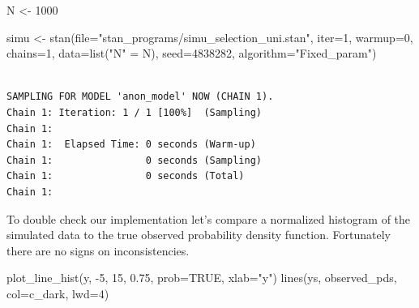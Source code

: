 \documentclass[
  letterpaper,
  DIV=11,
  numbers=noendperiod]{scrartcl}
\newenvironment{Shaded}{\begin{snugshade}}{\end{snugshade}}
\newcommand{\AttributeTok}[1]{\textcolor[rgb]{0.40,0.45,0.13}{#1}}
\newcommand{\ConstantTok}[1]{\textcolor[rgb]{0.56,0.35,0.01}{#1}}
\newcommand{\DecValTok}[1]{\textcolor[rgb]{0.68,0.00,0.00}{#1}}
\newcommand{\FloatTok}[1]{\textcolor[rgb]{0.68,0.00,0.00}{#1}}
\newcommand{\FunctionTok}[1]{\textcolor[rgb]{0.28,0.35,0.67}{#1}}
\newcommand{\NormalTok}[1]{\textcolor[rgb]{0.00,0.23,0.31}{#1}}
\newcommand{\OtherTok}[1]{\textcolor[rgb]{0.00,0.23,0.31}{#1}}
\newcommand{\SpecialCharTok}[1]{\textcolor[rgb]{0.37,0.37,0.37}{#1}}
\newcommand{\StringTok}[1]{\textcolor[rgb]{0.13,0.47,0.30}{#1}}
\begin{document}
\begin{Shaded}
\begin{Highlighting}[]
\NormalTok{N }\OtherTok{\textless{}{-}} \DecValTok{1000}

\NormalTok{simu }\OtherTok{\textless{}{-}} \FunctionTok{stan}\NormalTok{(}\AttributeTok{file=}\StringTok{"stan\_programs/simu\_selection\_uni.stan"}\NormalTok{,}
             \AttributeTok{iter=}\DecValTok{1}\NormalTok{, }\AttributeTok{warmup=}\DecValTok{0}\NormalTok{, }\AttributeTok{chains=}\DecValTok{1}\NormalTok{, }\AttributeTok{data=}\FunctionTok{list}\NormalTok{(}\StringTok{"N"} \OtherTok{=}\NormalTok{ N),}
             \AttributeTok{seed=}\DecValTok{4838282}\NormalTok{, }\AttributeTok{algorithm=}\StringTok{"Fixed\_param"}\NormalTok{)}
\end{Highlighting}
\end{Shaded}

\begin{verbatim}

SAMPLING FOR MODEL 'anon_model' NOW (CHAIN 1).
Chain 1: Iteration: 1 / 1 [100%]  (Sampling)
Chain 1: 
Chain 1:  Elapsed Time: 0 seconds (Warm-up)
Chain 1:                0 seconds (Sampling)
Chain 1:                0 seconds (Total)
Chain 1: 
\end{verbatim}

\begin{Shaded}
\end{Shaded}

To double check our implementation let's compare a normalized histogram
of the simulated data to the true observed probability density function.
Fortunately there are no signs on inconsistencies.

\begin{Shaded}
\begin{Highlighting}[]
\FunctionTok{plot\_line\_hist}\NormalTok{(y, }\SpecialCharTok{{-}}\DecValTok{5}\NormalTok{, }\DecValTok{15}\NormalTok{, }\FloatTok{0.75}\NormalTok{, }\AttributeTok{prob=}\ConstantTok{TRUE}\NormalTok{, }\AttributeTok{xlab=}\StringTok{"y"}\NormalTok{)}
\FunctionTok{lines}\NormalTok{(ys, observed\_pds, }\AttributeTok{col=}\NormalTok{c\_dark, }\AttributeTok{lwd=}\DecValTok{4}\NormalTok{)}
\end{Highlighting}
\end{Shaded}
\end{document}
